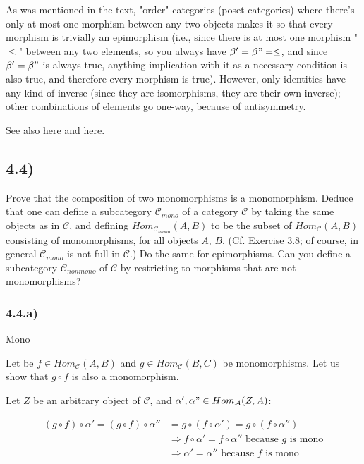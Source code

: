 \documentclass[12pt, letterpaper, twoside]{report}
\begin{document}
As was mentioned in the text, "order" categories (poset categories) where there's only at most one morphism between any two objects makes it so that every morphism is trivially an epimorphism (i.e., since there is at most one morphism "$\leq$" between any two elements, so you always have $\beta' = \beta" = \leq$, and since $\beta' = \beta"$ is always true, anything implication with it as a necessary condition is also true, and therefore every morphism is true). However, only identities have any kind of inverse (since they are isomorphisms, they are their own inverse); other combinations of elements go one-way, because of antisymmetry.

See also \href{https://ncatlab.org/nlab/show/partial+order}{here} and \href{https://math.stackexchange.com/questions/81123/examples-of-categories-where-epimorphism-does-not-have-a-right-inverse-not-surj}{here}.



\subsection*{4.4)}

Prove that the composition of two monomorphisms is a monomorphism. Deduce that one can define a subcategory $\mathcal{C}_{mono}$ of a category $\mathcal{C}$ by taking the same objects as in $\mathcal{C}$, and defining $Hom_{\mathcal{C}_{mono}} (A, B)$ to be the subset of $Hom_\mathcal{C} (A, B)$ consisting of monomorphisms, for all objects $A$, $B$. (Cf. Exercise 3.8; of course, in general $\mathcal{C}_{mono}$ is not full in $\mathcal{C}$.) Do the same for epimorphisms. Can you define a subcategory $\mathcal{C}_{nonmono}$ of $\mathcal{C}$ by restricting to morphisms that are not monomorphisms?

\subsubsection*{4.4.a)} Mono

Let be $f \in Hom_{\mathcal{C}} (A, B)$ and $g \in Hom_{\mathcal{C}} (B, C)$ be monomorphisms. Let us show that $g \circ f$ is also a monomorphism.

Let $Z$ be an arbitrary object of $\mathcal{C}$, and $\alpha', \alpha" \in Hom_{\mathcal{A}} (Z, A)$:

$$
\begin{aligned}
	(g \circ f) \circ \alpha' = (g \circ f) \circ \alpha''
		& = g \circ (f \circ \alpha') = g \circ (f \circ \alpha'') \\
		& \Rightarrow f \circ \alpha' = f \circ \alpha'' \text{ because $g$ is mono} \\
		& \Rightarrow         \alpha' =         \alpha'' \text{ because $f$ is mono}
\end{aligned}
$$
\end{document}
